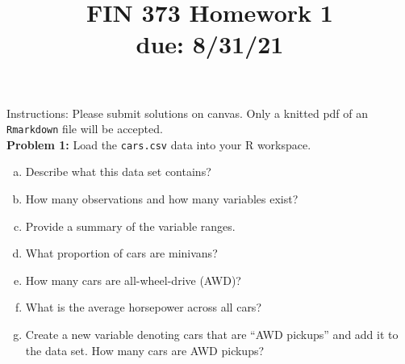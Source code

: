 \documentclass[11pt]{article}
\begin{document}
\title{FIN 373 Homework 1 \\ {\large due: \textbf{8/31/21}}}
\date{}
\maketitle

\vspace{-20mm}

\noindent Instructions: Please submit solutions on canvas.  Only a knitted pdf of an {\tt Rmarkdown} file will be accepted.
\\

\noindent \textbf{Problem 1:} Load the {\tt cars.csv} data into your R workspace.
\begin{enumerate}[a.]
	\item Describe what this data set contains?
	\item How many observations and how many variables exist?
	\item Provide a summary of the variable ranges.
	\item What proportion of cars are minivans?
	\item How many cars are all-wheel-drive (AWD)?
	\item What is the average horsepower across all cars?
	\item Create a new variable denoting cars that are ``AWD pickups'' and add it to the data set.  How many cars are AWD pickups?
\end{enumerate}

\vspace{10mm}

\end{document}
